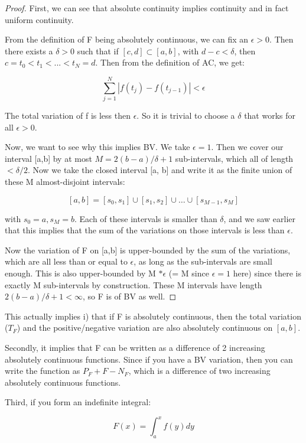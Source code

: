 \documentclass[class=article, crop=false]{standalone}
\begin{document}
			\begin{proof}
				First, we can see that absolute continuity implies continuity and in fact uniform continuity.

				From the definition of F being absolutely continuous, we can fix an $\epsilon > 0$. Then there exists a $\delta > 0$ such that if $[c, d] \subset [a,b]$, with $d-c < \delta$, then $c = t_0 < t_1 < ... < t_N = d$. Then from the definition of AC, we get:

					$$\sum_{j=1}^N |f(t_j) - f(t_{j-1})| < \epsilon$$

				The total variation of f is less then $\epsilon$. So it is trivial to choose a $\delta$ that works for all $\epsilon > 0$.

				Now, we want to see why this implies BV. We take $\epsilon = 1$. Then we cover our interval [a,b] by at most $M = 2(b-a)/ \delta + 1$ sub-intervals, which all of length $< \delta / 2$. Now we take the closed interval [a, b] and write it as the finite union of these M almost-disjoint intervals:

					$$[a,b] = [s_0, s_1] \cup [s_1, s_2] \cup \hdots \cup [s_{M-1}, s_M]$$

				with $s_0 = a, s_M = b$. Each of these intervals is smaller than $\delta$, and we saw earlier that this implies that the sum of the variations on those intervals is less than $\epsilon$.

				Now the variation of F on [a,b] is upper-bounded by the sum of the variations, which are all less than or equal to $\epsilon$, as long as the sub-intervals are small enough. This is also upper-bounded by M $* \epsilon$ (= M since $\epsilon = 1$ here) since there is exactly M sub-intervals by construction. These M intervals have length $2(b-a)/ \delta + 1 < \infty$, so F is of BV as well.
			\end{proof}

			This actually implies i) that if F is absolutely continuous, then the total variation ($T_F$) and the positive/negative variation are also absolutely continuous on $[a,b]$. 

			Secondly, it implies that F can be written as a difference of 2 increasing absolutely continuous functions. Since if you have a BV variation, then you can write the function as $P_F + F - N_F$, which is a difference of two increasing absolutely continuous functions.

			Third, if you form an indefinite integral:

				$$F(x) = \int_a^x f(y)dy$$
\end{document}
